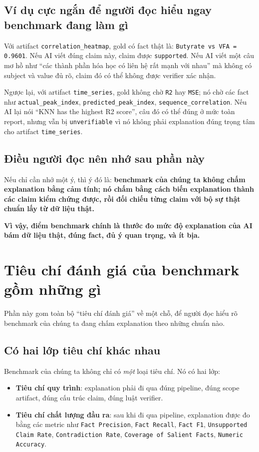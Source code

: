 \documentclass[11pt,a4paper]{article}
\newcommand{\field}[1]{\texttt{#1}}
\begin{document}
\subsection{Ví dụ cực ngắn để người đọc hiểu ngay benchmark đang làm gì}
Với artifact \field{correlation\_heatmap}, gold có fact thật là:
\field{Butyrate vs VFA = 0.9601}.
Nếu AI viết đúng claim này, claim được \field{supported}.
Nếu AI viết một câu mơ hồ như ``các thành phần hóa học có liên hệ rất mạnh với nhau'' mà không có subject và value đủ rõ,
claim đó có thể không được verifier xác nhận.

Ngược lại, với artifact \field{time\_series}, gold không chờ \field{R2} hay \field{MSE};
nó chờ các fact như \field{actual\_peak\_index}, \field{predicted\_peak\_index}, \field{sequence\_correlation}.
Nếu AI lại nói ``KNN has the highest R2 score'', câu đó có thể đúng ở mức toàn report,
nhưng vẫn bị \field{unverifiable} vì nó không phải explanation đúng trọng tâm cho artifact \field{time\_series}.

\subsection{Điều người đọc nên nhớ sau phần này}
Nếu chỉ cần nhớ một ý, thì ý đó là:
\textbf{benchmark của chúng ta không chấm explanation bằng cảm tính; nó chấm bằng cách biến explanation thành các claim kiểm chứng được, rồi đối chiếu từng claim với bộ sự thật chuẩn lấy từ dữ liệu thật.}

\textbf{Vì vậy, điểm benchmark chính là thước đo mức độ explanation của AI bám dữ liệu thật, đúng fact, đủ ý quan trọng, và ít bịa.}

\section{Tiêu chí đánh giá của benchmark gồm những gì}

Phần này gom toàn bộ ``tiêu chí đánh giá'' về một chỗ, để người đọc hiểu rõ benchmark của chúng ta đang chấm explanation theo những chuẩn nào.

\subsection{Có hai lớp tiêu chí khác nhau}
Benchmark của chúng ta không chỉ có \emph{một} loại tiêu chí.
Nó có hai lớp:

\begin{itemize}
  \item \textbf{Tiêu chí quy trình}: explanation phải đi qua đúng pipeline, đúng scope artifact, đúng cấu trúc claim, đúng luật verifier.
  \item \textbf{Tiêu chí chất lượng đầu ra}: sau khi đi qua pipeline, explanation được đo bằng các metric như \field{Fact Precision}, \field{Fact Recall}, \field{Fact F1}, \field{Unsupported Claim Rate}, \field{Contradiction Rate}, \field{Coverage of Salient Facts}, \field{Numeric Accuracy}.
\end{itemize}
\end{document}
